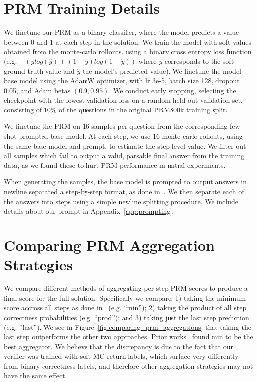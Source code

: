 \documentclass[11pt, letterpaper, logo]{googledeepmind}
\begin{document}
\section{PRM Training Details}
\label{app:prm_training}

We finetune our PRM as a binary classifier, where the model predicts a value between 0 and 1 at each step in the solution. We train the model with soft values obtained from the monte-carlo rollouts, using a binary cross entropy loss function (e.g. $-(ylog(\hat{y})+(1-y)log(1-\hat{y}))$ where $y$ corresponds to the soft ground-truth value and $\hat{y}$ the model's predicted value). We finetune the model base model using the AdamW optimizer, with lr 3e-5, batch size 128, dropout 0.05, and Adam betas $(0.9, 0.95)$. We conduct early stopping, selecting the checkpoint with the lowest validation loss on a random held-out validation set, consisting of 10\% of the questions in the original PRM800k training split.

We finetune the PRM on 16 samples per question from the corresponding few-shot prompted base model. At each step, we use 16 monte-carlo rollouts, using the same base model and prompt, to estimate the step-level value. We filter out all samples which fail to output a valid, parsable final answer from the training data, as we found these to hurt PRM performance in initial experiments.

When generating the samples, the base model is prompted to output answers in newline separated a step-by-step format, as done in~\citet{lightman2023lets}. We then separate each of the answers into steps using a simple newline splitting procedure. We include details about our prompt in Appendix~\ref{app:prompting}.

\section{Comparing PRM Aggregation Strategies}
\label{app:comparing_prm_agg}

We compare different methods of aggregating per-step PRM scores to produce a final score for the full solution. Specifically we compare: 1) taking the minimum score accross all steps as done in~\citet{lightman2023lets} (e.g. ``min''); 2) taking the product of all step correctness probabilities (e.g. ``prod''); and 3) taking just the last step prediction (e.g. ``last''). We see in Figure~\ref{fig:comparing_prm_aggregations} that taking the last step outperforms the other two approaches. Prior works~\citep{lightman2023lets,wang2023mathshepherd} found min to be the best aggregator. We believe that the discrepancy is due to the fact that our verifier was trained with soft MC return labels, which surface very differently from binary correctness labels, and therefore other aggregation strategies may not have the same effect.
\end{document}
